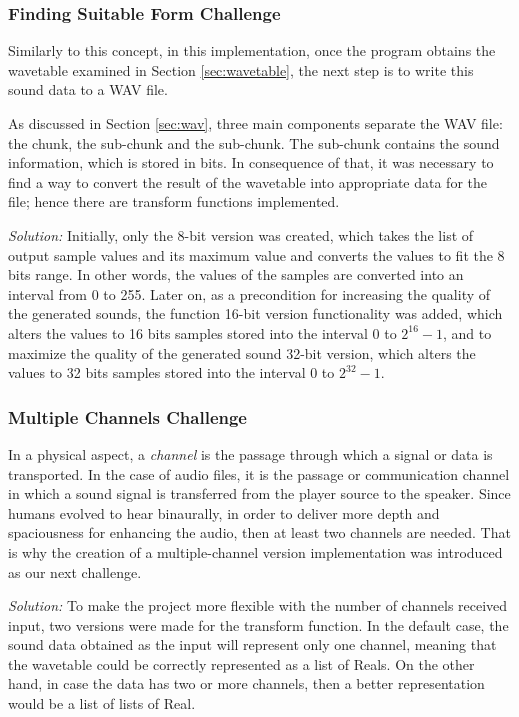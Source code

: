 \documentclass[runningheads]{llncs}
\begin{document}
\subsubsection{Finding Suitable Form Challenge} Similarly to this concept, in this implementation, once the program obtains the wavetable examined in Section \ref{sec:wavetable}, the next step is to write this sound data to a WAV file.

As discussed in Section \ref{sec:wav}, three main components separate the WAV file: the  chunk\label{gloss:RIFF}, the  sub-chunk and the  sub-chunk. The  sub-chunk contains the sound information, which is stored in bits. In consequence of that, it was necessary to find a way to convert the result of the wavetable into appropriate data for the file; hence there are transform functions implemented. 

\textit{Solution:} Initially, only the 8-bit version was created, which takes the list of output sample values and its maximum value and converts the values to fit the 8 bits range. In other words, the values of the samples are converted into an interval from 0 to 255. Later on, as a precondition for increasing the quality of the generated sounds, the function 16-bit version functionality was added, which alters the values to 16 bits samples stored into the interval 0 to $2^{16}-1$, and to maximize the quality of the generated sound 32-bit version, which alters the values to 32 bits samples stored into the interval 0 to $2^{32}-1$.

\subsubsection{Multiple Channels Challenge}
In a physical aspect, a \emph{channel}\label{gloss:channel} is the passage through which a signal or data is transported. In the case of audio files, it is the passage or communication channel in which a sound signal is transferred from the player source to the speaker. Since humans evolved to hear binaurally, in order to deliver more depth and spaciousness for enhancing the audio, then at least two channels are needed. That is why the creation of a multiple-channel version implementation was introduced as our next challenge.

\textit{Solution:} To make the project more flexible with the number of channels received input, two versions were made for the transform function. In the default case, the sound data obtained as the input will represent only one channel, meaning that the wavetable could be correctly represented as a list of Reals. On the other hand, in case the data has two or more channels, then a better representation would be a list of lists of Real. 
\end{document}
